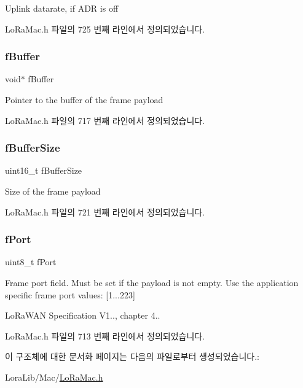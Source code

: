Uplink datarate, if A\+DR is off 

Lo\+Ra\+Mac.\+h 파일의 725 번째 라인에서 정의되었습니다.

\mbox{\label{structs_mcps_req_unconfirmed_a2e9f11cf5a8f2a797999359bedee31af}} 
\subsubsection{\texorpdfstring{f\+Buffer}{fBuffer}}
{\footnotesize\ttfamily void$\ast$ f\+Buffer}

Pointer to the buffer of the frame payload 

Lo\+Ra\+Mac.\+h 파일의 717 번째 라인에서 정의되었습니다.

\mbox{\label{structs_mcps_req_unconfirmed_a6b4fc83528d7391a193516d9f4ba985b}} 
\subsubsection{\texorpdfstring{f\+Buffer\+Size}{fBufferSize}}
{\footnotesize\ttfamily uint16\+\_\+t f\+Buffer\+Size}

Size of the frame payload 

Lo\+Ra\+Mac.\+h 파일의 721 번째 라인에서 정의되었습니다.

\mbox{\label{structs_mcps_req_unconfirmed_a2973de9ac0ab5e876b80362bc4c6a88b}} 
\subsubsection{\texorpdfstring{f\+Port}{fPort}}
{\footnotesize\ttfamily uint8\+\_\+t f\+Port}

Frame port field. Must be set if the payload is not empty. Use the application specific frame port values\+: \mbox{[}1...223\mbox{]}

Lo\+Ra\+W\+AN Specification V1.., chapter 4.. 

Lo\+Ra\+Mac.\+h 파일의 713 번째 라인에서 정의되었습니다.



이 구조체에 대한 문서화 페이지는 다음의 파일로부터 생성되었습니다.\+:\begin{DoxyCompactItemize}
\item 
Lora\+Lib/\+Mac/\mbox{\hyperlink{_lo_ra_mac_8h}{Lo\+Ra\+Mac.\+h}}\end{DoxyCompactItemize}
